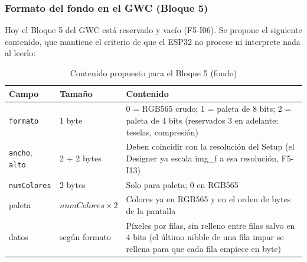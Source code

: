 \subsubsection{Formato del fondo en el GWC (Bloque 5)}

Hoy el Bloque 5 del GWC está reservado y vacío (F5-I06). Se propone el siguiente contenido, que mantiene el criterio de que el ESP32 no procese ni interprete nada al leerlo:

\begin{table}[H]
	\centering
	\begin{tabular}{llp{7.5cm}}
		\toprule
		Campo & Tamaño & Contenido \\
		\midrule
		\texttt{formato} & 1 byte & 0 = RGB565 crudo; 1 = paleta de 8 bits; 2 = paleta de 4 bits (reservados 3 en adelante: teselas, compresión) \\
		\texttt{ancho}, \texttt{alto} & 2 + 2 bytes & Deben coincidir con la resolución del Setup (el Designer ya escala img\_f a esa resolución, F5-I13) \\
		\texttt{numColores} & 2 bytes & Solo para paleta; 0 en RGB565 \\
		paleta & $numColores\times 2$ & Colores ya en RGB565 y en el orden de bytes de la pantalla \\
		datos & según formato & Píxeles por filas, sin relleno entre filas salvo en 4 bits (el último nibble de una fila impar se rellena para que cada fila empiece en byte) \\
		\bottomrule
	\end{tabular}
	\caption{Contenido propuesto para el Bloque 5 (fondo)}
	\label{tab:F6I01Bloque5}
\end{table}

